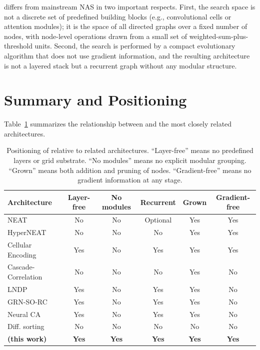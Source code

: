 \modnet{} differs from mainstream NAS in two important respects. First,
the search space is not a discrete set of predefined building blocks
(e.g., convolutional cells or attention modules); it is the space of
all directed graphs over a fixed number of nodes, with node-level
operations drawn from a small set of weighted-sum-plus-threshold units.
Second, the search is performed by a compact evolutionary algorithm
that does not use gradient information, and the resulting architecture
is not a layered stack but a recurrent graph without any modular
structure.

\section{Summary and Positioning}
\label{sec:related-positioning}

Table~\ref{tab:positioning} summarizes the relationship between
\modnet{} and the most closely related architectures.

\begin{table}[h]
  \centering
  \small
  \caption{Positioning of \modnet{} relative to related architectures.
    ``Layer-free'' means no predefined layers or grid substrate.
    ``No modules'' means no explicit modular grouping.
    ``Grown'' means both addition and pruning of nodes.
    ``Gradient-free'' means no gradient information at any stage.}
  \label{tab:positioning}
  \begin{tabular}{lccccc}
    \toprule
    \textbf{Architecture} & \textbf{Layer-free} & \textbf{No modules}
      & \textbf{Recurrent} & \textbf{Grown} & \textbf{Gradient-free} \\
    \midrule
    NEAT \citep{stanley2002evolving}           & No  & No  & Optional & Yes & Yes \\
    HyperNEAT \citep{stanley2009hypercube}     & No  & No  & No       & Yes & Yes \\
    Cellular Encoding \citep{gruau1994neural}  & Yes & No  & Yes      & Yes & Yes \\
    Cascade-Correlation \citep{fahlman1990cascade} & No & No & No  & Yes & No  \\
    LNDP \citep{plantec2024evolving}           & Yes & No  & Yes      & Yes & No  \\
    GRN-SO-RC \citep{hajizada2024developmental}& Yes & No  & Yes      & Yes & No  \\
    Neural CA \citep{mordvintsev2020growing}   & Yes & No  & Yes      & Yes & No  \\
    Diff. sorting \citep{petersen2022deep}     & No  & No  & No       & No  & No  \\
    \textbf{\modnet{} (this work)}             & \textbf{Yes} & \textbf{Yes}
      & \textbf{Yes} & \textbf{Yes} & \textbf{Yes} \\
    \bottomrule
  \end{tabular}
\end{table}

